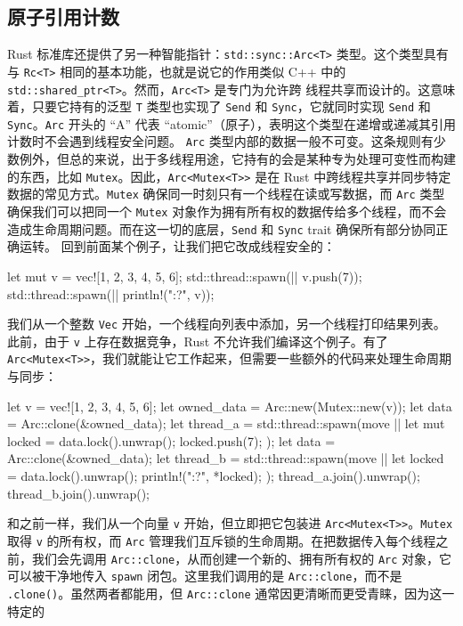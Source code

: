 \subsection{原子引用计数}
\label{idx:idx_8d9351a1}
Rust 标准库还提供了另一种智能指针：\texttt{std::\allowbreak{}sync::\allowbreak{}Arc<\allowbreak{}T>\allowbreak{}} 类型。这个类型具有与 \texttt{Rc<T>} 相同的基本功能，也就是说它的作用类似
\label{idx:idx_f0fa667b}
C++ 中的 \texttt{std::\allowbreak{}shared\_\allowbreak{}ptr<\allowbreak{}T>\allowbreak{}}。然而，\texttt{Arc<T>} 是专门为允许跨
线程共享而设计的。这意味着，只要它持有的泛型 \texttt{T} 类型也实现了 \texttt{Send} 和 \texttt{Sync}，它就同时实现 \texttt{Send} 和 \texttt{Sync}。\texttt{Arc} 开头的 “A” 代表 “atomic”（原子），表明这个类型在递增或递减其引用计数时不会遇到线程安全问题。
\texttt{Arc} 类型内部的数据一般不可变。这条规则有少数例外，但总的来说，出于多线程用途，它持有的会是某种专为处理可变性而构建的东西，比如 \texttt{Mutex}。因此，\texttt{Arc<\allowbreak{}Mutex<\allowbreak{}T>\allowbreak{}>\allowbreak{}} 是在 Rust 中跨线程共享并同步特定数据的常见方式。\texttt{Mutex} 确保同一时刻只有一个线程在读或写数据，而 \texttt{Arc} 类型确保我们可以把同一个 \texttt{Mutex} 对象作为拥有所有权的数据传给多个线程，而不会造成生命周期问题。而在这一切的底层，\texttt{Send} 和 \texttt{Sync} trait 确保所有部分协同正确运转。
回到前面某个例子，让我们把它改成线程安全的：
\begin{codebox}[rust]
let mut v = vec![1, 2, 3, 4, 5, 6];
std::thread::spawn(|| v.push(7));
std::thread::spawn(|| println!("{:?}", v));
\end{codebox}
\label{idx:idx_016eb8c1}
\label{idx:idx_9edc9d5d}
我们从一个整数 \texttt{Vec} 开始，一个线程向列表中添加，另一个线程打印结果列表。此前，由于 \texttt{v} 上存在数据竞争，Rust 不允许我们编译这个例子。有了 \texttt{Arc<\allowbreak{}Mutex<\allowbreak{}T>\allowbreak{}>\allowbreak{}}，我们就能让它工作起来，但需要一些额外的代码来处理生命周期与同步：
\begin{codebox}[rust]
let v = vec![1, 2, 3, 4, 5, 6];
let owned_data = Arc::new(Mutex::new(v));
let data = Arc::clone(&owned_data);
let thread_a = std::thread::spawn(move || {
      let mut locked = data.lock().unwrap();
      locked.push(7);
});
let data = Arc::clone(&owned_data);
let thread_b = std::thread::spawn(move || {
      let locked = data.lock().unwrap();
      println!("{:?}", *locked);
});
thread_a.join().unwrap();
thread_b.join().unwrap();
\end{codebox}
和之前一样，我们从一个向量 \texttt{v} 开始，但立即把它包装进 \texttt{Arc<\allowbreak{}Mutex<\allowbreak{}T>\allowbreak{}>\allowbreak{}}。\texttt{Mutex} 取得 \texttt{v} 的所有权，而 \texttt{Arc} 管理我们互斥锁的生命周期。在把数据传入每个线程之前，我们会先调用 \texttt{Arc::clone}，从而创建一个新的、拥有所有权的 \texttt{Arc} 对象，它可以被干净地传入 \texttt{spawn} 闭包。这里我们调用的是 \texttt{Arc::clone}，而不是 \texttt{.clone()}。虽然两者都能用，但 \texttt{Arc::clone} 通常因更清晰而更受青睐，因为这一特定的
